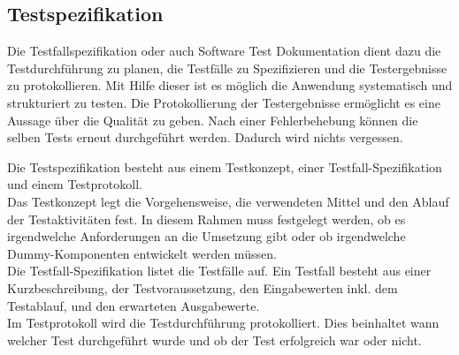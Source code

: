 \subsection{Testspezifikation}  \label{Testspezifikation}

Die Testfallspezifikation oder auch Software Test Dokumentation dient dazu die Testdurchführung zu planen, die Testfälle 
zu Spezifizieren und die Testergebnisse zu protokollieren. Mit Hilfe dieser ist es möglich die Anwendung systematisch 
und strukturiert zu testen. Die Protokollierung der Testergebnisse ermöglicht es eine Aussage über die Qualität zu geben.
Nach einer Fehlerbehebung können die selben Tests erneut durchgeführt werden. Dadurch wird nichts vergessen.

Die Testspezifikation besteht aus einem Testkonzept, einer Testfall-Spezifikation und einem Testprotokoll.\\
Das Testkonzept legt die Vorgehensweise, die verwendeten Mittel und den Ablauf der Testaktivitäten fest. In diesem Rahmen
muss festgelegt werden, ob es irgendwelche Anforderungen an die Umsetzung gibt oder ob irgendwelche Dummy-Komponenten 
entwickelt werden müssen.\\
Die Testfall-Spezifikation listet die Testfälle auf. Ein Testfall besteht aus einer Kurzbeschreibung, der Testvoraussetzung, 
den Eingabewerten inkl. dem Testablauf, und den erwarteten Ausgabewerte.\\
Im Testprotokoll wird die Testdurchführung protokolliert. Dies beinhaltet wann welcher Test durchgeführt wurde und ob 
der Test erfolgreich war oder nicht.